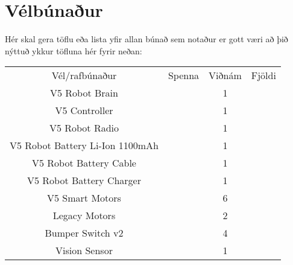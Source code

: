 \section{Vélbúnaður}
Hér skal gera töflu eða lista yfir allan búnað sem notaður er gott væri að þið nýttuð ykkur töfluna hér fyrir neðan:

\begin{center}
\begin{tabular}{ |c|c|c|c| } 
 \hline
 Vél/rafbúnaður &Spenna &Viðnám &Fjöldi\\ 
 V5 Robot Brain & & 1\\
 V5 Controller& & 1\\ 
 V5 Robot Radio& & 1\\ 
 V5 Robot Battery Li-Ion 1100mAh& & 1\\ 
 V5 Robot Battery Cable& & 1\\ 
 V5 Robot Battery Charger& & 1\\ 
 V5 Smart Motors& & 6\\
 Legacy Motors & & 2\\
 Bumper Switch v2& & 4\\ 
 Vision Sensor& & 1\\
 \hline
\end{tabular}
\end{center}